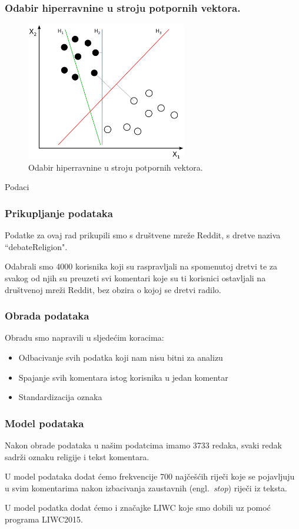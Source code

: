 \documentclass{beamer}
\begin{document}
\begin{frame}
\frametitle{Odabir hiperravnine u stroju potpornih vektora.}
\begin{figure}[]
	\centering
	\includegraphics[width=7cm]{img/svm.png}
	\caption{Odabir hiperravnine u stroju potpornih vektora. }
	\label{fig:logistic}
\end{figure}
\end{frame}

\begin{frame}
\begin{center}
\Huge Podaci
\end{center}
\end{frame}

\begin{frame}
\frametitle{Prikupljanje podataka}
Podatke za ovaj rad prikupili smo s društvene mreže Reddit, s dretve naziva ``debateReligion".
\bigskip

Odabrali smo 4000 korisnika koji su raspravljali na spomenutoj dretvi te za svakog od njih su preuzeti svi komentari koje su ti korisnici ostavljali na društvenoj mreži Reddit, bez obzira o kojoj se dretvi radilo.

\end{frame}

\begin{frame}
\frametitle{Obrada podataka}
Obradu smo napravili u sljedećim koracima:

\begin{itemize}
\item Odbacivanje svih podatka koji nam nisu bitni za analizu
\item Spajanje svih komentara istog korisnika u jedan komentar
\item Standardizacija oznaka
\end{itemize}
\end{frame}

\begin{frame}
\frametitle{Model podataka}
Nakon obrade podataka u našim podatcima imamo 3733 redaka, svaki redak sadrži oznaku religije i tekst komentara.
\bigskip

U model podataka dodat ćemo frekvencije 700 najčešćih riječi koje se pojavljuju u svim komentarima nakon izbacivanja zaustavnih (engl.~\emph{stop}) riječi iz teksta.
\bigskip

U model podatka dodat ćemo i značajke LIWC koje smo dobili uz pomoć programa LIWC2015.

\end{frame}
\end{document}
